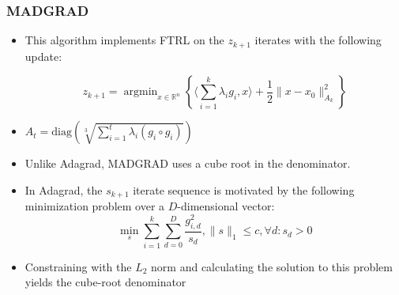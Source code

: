 \documentclass{beamer}
\newcommand{\R}{\mathbb{R}}
\newcommand{\argmin}{\mathop{\text{argmin}}}
\newcommand{\diag}{\text{diag}}
\begin{document}
\begin{frame}[shrink=10]
  \frametitle{MADGRAD}

  \begin{itemize}
    \item This algorithm implements FTRL on the $z_{k+1}$ iterates with the following update:

      \[
        z_{k+1} = \argmin_{x \in \R^n}\left\{\langle \sum\limits_{i=1}^{k}\lambda_i g_i, x \rangle + \frac{1}{2}\|x
        - x_0\|_{A_k}^2\right\}
      \]

    \item $A_t = \diag\left(\sqrt[3]{\sum\limits_{i=1}^{t} \lambda_i (g_{i} \circ g_i)}\right)$
    \item Unlike Adagrad\cite{duchi_adaptive_nodate}, MADGRAD uses a cube root in the denominator. 
    \item In Adagrad, the $s_{k+1}$ iterate sequence is motivated by the following minimization problem over a $D$-dimensional vector:
      \[
        \min_{s} \sum\limits_{i=1}^k\sum\limits_{d=0}^D \frac{g_{i,d}^2}{s_{d}}, \|s\|_1 \leq c, \forall d: s_d > 0
      \]
    \item Constraining with the $L_2$ norm and calculating the solution to this problem yields the cube-root denominator
  \end{itemize}
\end{frame}
\end{document}
